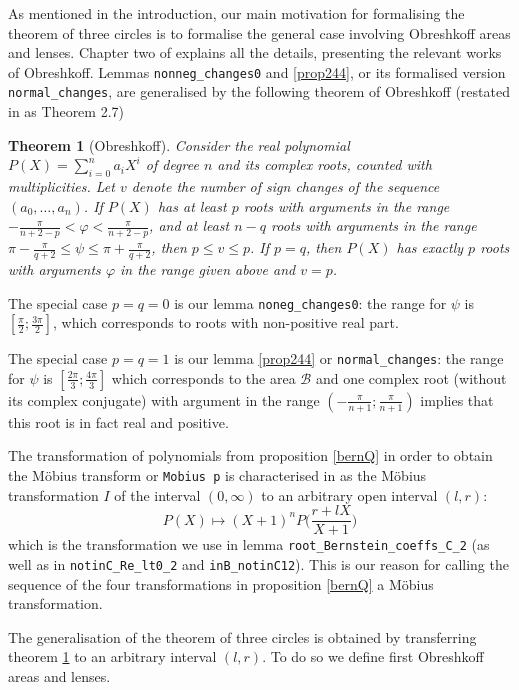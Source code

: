 \documentclass[11pt, a4paper]{article}
\newtheorem{mtheorem}{Theorem}[section]
\newcommand{\ssb}{{\mathcal B}}
\begin{document}
As mentioned in the introduction, our main motivation for formalising the theorem of three circles is to formalise the general case involving Obreshkoff areas and lenses. Chapter two of \cite{eigenwillig_phd} explains all the details, presenting the relevant works of Obreshkoff. Lemmas \lstinline!nonneg_changes0! and \ref{prop244}, or its formalised version \lstinline!normal_changes!, are generalised by the following theorem of Obreshkoff  (restated in \cite{eigenwillig_phd} as Theorem 2.7)
\begin{mtheorem}[Obreshkoff]
Consider the real polynomial \\$P(X)=\sum_{i=0}^n a_i X^i$ of degree $n$ and its complex roots, counted with multiplicities. Let $v$ denote the number of sign changes of the sequence $(a_0, \ldots, a_n)$. If $P(X)$ has at least $p$ roots with arguments in the range $-\frac{\pi}{n+2-p} < \varphi < \frac{\pi}{n+2-p}$, and at least $n-q$ roots with arguments in the range $\pi - \frac{\pi}{q+2} \leq \psi \leq \pi + \frac{\pi}{q+2}$, then $p \leq v \leq p$. If $p=q$, then $P(X)$ has exactly $p$ roots with arguments $\varphi$ in the range given above and $v = p$.
\label{theorem227}
\end{mtheorem}

The special case $p = q = 0$ is our lemma \lstinline!noneg_changes0!:
the range for $\psi$ is $[\frac{\pi}{2};\frac{3\pi}{2}]$, which corresponds to roots with non-positive real part.
 
The special case $p=q=1$ is our lemma \ref{prop244} or \lstinline!normal_changes!: the range for $\psi$ is $[\frac{2\pi}{3};\frac{4\pi}{3}]$ which corresponds to the area $\ssb$ and one complex root (without its complex conjugate) with argument in the range $(-\frac{\pi}{n+1}; \frac{\pi}{n+1})$ implies that this root is in fact real and positive.

The transformation of polynomials from proposition \ref{bernQ} in order to obtain the M\"obius transform or \lstinline!Mobius p! is characterised in \cite{eigenwillig_phd} as the M\"obius transformation $I$ of the interval $(0,\infty)$ to an arbitrary open interval $(l,r)$:
\[P(X) \mapsto (X+1)^n P\biggl(\frac{r + lX}{X+1}\biggr) \]
which is the transformation we use in lemma \lstinline!root_Bernstein_coeffs_C_2! (as well as in \lstinline!notinC_Re_lt0_2! and \lstinline!inB_notinC12!). This is our reason for calling the sequence of the four transformations in proposition \ref{bernQ} a M\"obius transformation.

The generalisation of the theorem of three circles is obtained by transferring theorem \ref{theorem227} to an arbitrary interval $(l,r)$. To do so we define first Obreshkoff areas and lenses.
\end{document}
